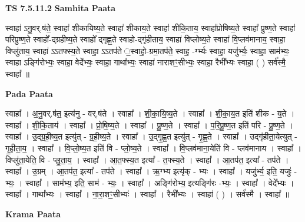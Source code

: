 \documentclass[17pt]{extarticle}
\begin{document}
\textbf{TS 7.5.11.2 } \newline
\textbf{Samhita Paata} \newline

स्वाहा॑ ऽनु॒वर्.ष॑ते॒ स्वाहा॑ शीकायिष्य॒ते स्वाहा॑ शीकाय॒ते स्वाहा॑ शीकि॒ताय॒ स्वाहा᳚प्रोषिष्य॒ते स्वाहा᳚ प्रुष्ण॒ते स्वाहा॑ परिप्रुष्ण॒ते स्वाहो᳚-द्ग्रहीष्य॒ते स्वाहो᳚ द्गृह्ण॒ते स्वाहो-द्गृ॑हीताय॒ स्वाहा॑ विप्लोष्य॒ते स्वाहा॑ वि॒प्लव॑मानाय॒ स्वाहा॒ विप्लु॑ताय॒ स्वाहा॑ ऽऽतफ्स्य॒ते स्वाहा॒ ऽऽतप॑ते ॒स्वाहो॒-ग्रमा॒तप॑ते॒ स्वाह॒ -र्ग्भ्यः स्वाहा॒ यजु॑र्भ्यः॒ स्वाहा॒ साम॑भ्यः॒ स्वाहा ऽङ्गि॑रोभ्यः॒ स्वाहा॒ वेदे᳚भ्यः॒ स्वाहा॒ गाथा᳚भ्यः॒ स्वाहा॑ नाराशꣳ॒॒सीभ्यः॒ स्वाहा॒ रैभी᳚भ्यः स्वाहा॒ ( ) सर्व॑स्मै॒ स्वाहा᳚ ॥ \newline

\textbf{Pada Paata} \newline

स्वाहा᳚ । अ॒नु॒वर्.ष॑त॒ इत्य॑नु - वर्.ष॑ते । स्वाहा᳚ । शी॒का॒यि॒ष्य॒ते । स्वाहा᳚ । शी॒का॒य॒त इति॑ शीक - य॒ते । स्वाहा᳚ । शी॒कि॒ताय॑ । स्वाहा᳚ । प्रो॒षि॒ष्य॒ते । स्वाहा᳚ । प्रु॒ष्ण॒ते । स्वाहा᳚ । प॒रि॒प्रु॒ष्ण॒त इति॑ परि - प्रु॒ष्ण॒ते । स्वाहा᳚ । उ॒द्ग्र॒ही॒ष्य॒त इत्यु॑त् - ग्र॒ही॒ष्य॒ते । स्वाहा᳚ । उ॒द्गृ॒ह्ण॒त इत्यु॑त् - गृ॒ह्ण॒ते । स्वाहा᳚ । उद्गृ॑हीता॒येत्युत् -   गृ॒ही॒ता॒य॒ । स्वाहा᳚ । वि॒प्लो॒ष्य॒त इति॑ वि - प्लो॒ष्य॒ते । स्वाहा᳚ । वि॒प्लव॑माना॒येति॑ वि - प्लव॑मानाय । स्वाहा᳚ । विप्लु॑ता॒येति॒ वि - प्लु॒ता॒य॒ । स्वाहा᳚ । आ॒त॒फ्स्य॒त इत्या᳚ - त॒फ्स्य॒ते । स्वाहा᳚ । आ॒तप॑त॒ इत्या᳚ - तप॑ते । स्वाहा᳚ । उ॒ग्रम् । आ॒तप॑त॒ इत्या᳚ - तप॑ते । स्वाहा᳚ । ऋ॒ग्भ्य इत्यृ॑क् - भ्यः । स्वाहा᳚ । यजु॑र्भ्य॒ इति॒ यजुः॑ - भ्यः॒ । स्वाहा᳚ । साम॑भ्य॒ इति॒ साम॑ - भ्यः॒ । स्वाहा᳚ । अङ्गि॑रोभ्य॒ इत्यङ्गि॑रः -भ्यः॒ । स्वाहा᳚ । वेदे᳚भ्यः । स्वाहा᳚ । गाथा᳚भ्यः । स्वाहा᳚ । ना॒रा॒शꣳ॒॒सीभ्यः॑ । स्वाहा᳚ । रैभी᳚भ्यः । स्वाहा॑ ( ) । सर्व॑स्मै । स्वाहा᳚ ॥  \newline


\textbf{Krama Paata} \newline
\end{document}
